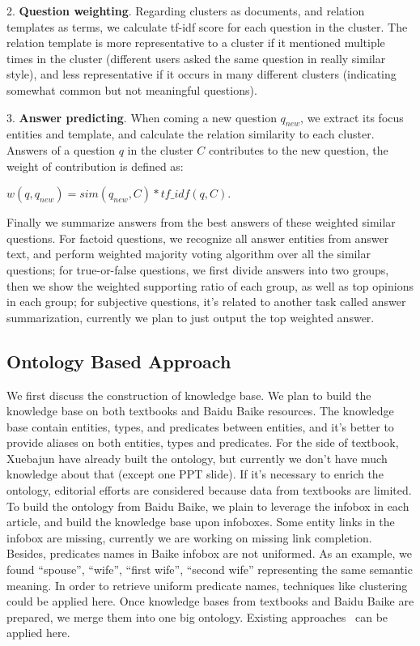 2. \textbf{Question weighting}. Regarding clusters as documents, and relation templates as terms,
we calculate tf-idf score for each question in the cluster.
The relation template is more representative to a cluster if it mentioned multiple times in the cluster (different users
asked the same question in really similar style), and less representative if it occurs in many different clusters
(indicating somewhat common but not meaningful questions).

3. \textbf{Answer predicting}. When coming a new question $q_{new}$, we extract its focus entities and template,
and calculate the relation similarity to each cluster.
Answers of a question $q$ in the cluster $C$ contributes to the new question, the weight of contribution
is defined as:

$w(q, q_{new}) = sim(q_{new}, C) * tf\_idf(q, C)$.

Finally we summarize answers from the best answers of these weighted similar questions.
For factoid questions, we recognize all answer entities from answer text, and perform
weighted majority voting algorithm over all the similar questions;
for true-or-false questions, we first divide answers into two groups, then we show
the weighted supporting ratio of each group, as well as top opinions in each group;
for subjective questions, it's related to another task called answer summarization,
currently we plan to just output the top weighted answer.





\subsection{Ontology Based Approach}

We first discuss the construction of knowledge base.
We plan to build the knowledge base on both textbooks and Baidu Baike resources.
The knowledge base contain entities, types, and predicates between entities,
and it's better to provide aliases on both entities, types and predicates.
For the side of textbook, Xuebajun have already built the ontology,
but currently we don't have much knowledge about that (except one PPT slide).
If it's necessary to enrich the ontology, editorial efforts are considered because
data from textbooks are limited.
To build the ontology from Baidu Baike, we plain to leverage the infobox in each
article, and build the knowledge base upon infoboxes.
Some entity links in the infobox are missing, currently we are working on missing link completion.
Besides, predicates names in Baike infobox are not uniformed.
As an example, we found ``spouse'', ``wife'', ``first wife'', ``second wife'' representing
the same semantic meaning.
In order to retrieve uniform predicate names, techniques like clustering could be applied here.
Once knowledge bases from textbooks and Baidu Baike are prepared, we merge them into one big ontology.
Existing approaches~\cite{xiang2015ersom} can be applied here.

